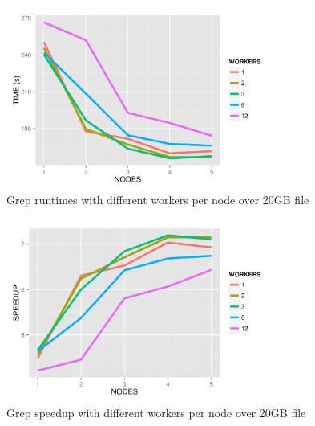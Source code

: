 \documentclass{article}
\begin{document}
    \begin{figure}[H]
        \centering
        \includegraphics[width=90mm]{images/workerPerNodeTimes.png}
        \caption{Grep runtimes with different workers per node over 20GB file}
        \label{fig:workNodeTime}
    \end{figure}



    \begin{figure}[H]
        \centering
        \includegraphics[width=90mm]{images/workerPerNodeSpeedup.png}
        \caption{Grep speedup with different workers per node over 20GB file}
    \end{figure}

\end{document}
